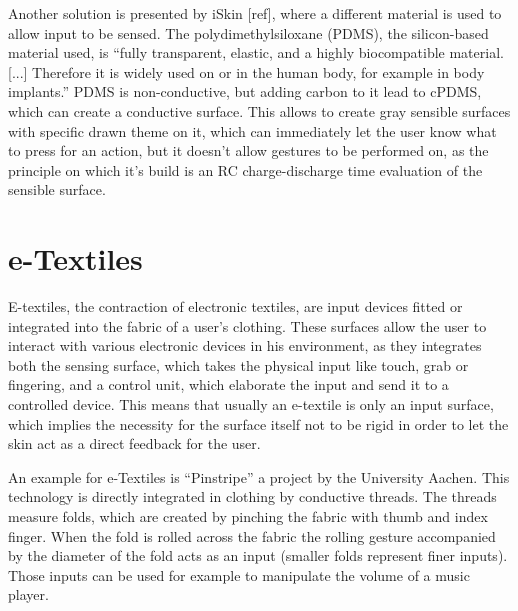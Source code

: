 \documentclass{sigchi}
\begin{document}
Another solution is presented by iSkin [ref], where a different material is used to allow input to be sensed. The polydimethylsiloxane (PDMS), the silicon-based material used, is “fully transparent, elastic, and a highly biocompatible material. [...] Therefore it is widely used on or in the human body, for example in body implants.” PDMS is non-conductive, but adding carbon to it lead to cPDMS, which can create a conductive surface. This allows to create gray sensible surfaces with specific drawn theme on it, which can immediately let the user know what to press for an action, but it doesn’t allow gestures to be performed on, as the principle on which it’s build is an RC charge-discharge time evaluation of the sensible surface.

\section{e-Textiles}
E-textiles, the contraction of electronic textiles, are input devices fitted or integrated into the fabric of a user's clothing. These surfaces allow the user to interact with various electronic devices in his environment, as they integrates both the sensing surface, which takes the physical input like touch, grab or fingering,  and a control unit, which elaborate the input and send it to a controlled device. This means that usually an e-textile is only an input surface, which implies the necessity for the surface itself not to be rigid in order to let the skin act as a direct feedback for the user.

An example for e-Textiles is “Pinstripe” a project by the University Aachen. This technology is directly integrated in clothing by conductive threads. The threads measure folds, which are created by pinching the fabric with thumb and index finger. When the fold is rolled across the fabric the rolling gesture accompanied by the diameter of the fold acts as an input (smaller folds represent finer inputs). Those inputs can be used for example to manipulate the volume of a music player.
\end{document}
